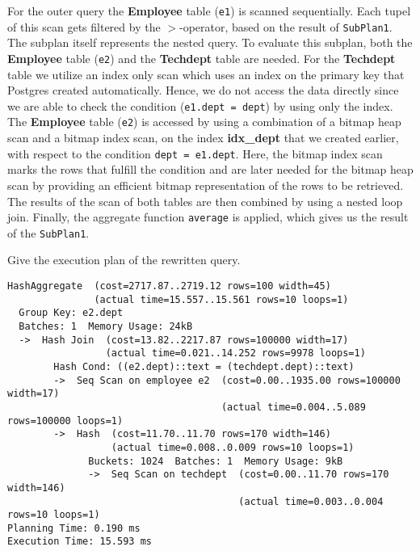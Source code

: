 \documentclass[11pt]{scrartcl}
\begin{document}
    For the outer query the \textbf{Employee} table (\texttt{e1}) is scanned sequentially.
    Each tupel of this scan gets filtered by the $>$-operator, based on the result of \texttt{SubPlan1}.
    The subplan itself represents the nested query.
    To evaluate this subplan, both the \textbf{Employee} table (\texttt{e2}) and the \textbf{Techdept} table are needed.
    For the \textbf{Techdept} table we utilize an index only scan which uses an index on the primary key that Postgres created
    automatically.
    Hence, we do not access the data directly since we are able to check the condition (\texttt{e1.dept = dept}) by using only
    the index.
    The \textbf{Employee} table (\texttt{e2}) is accessed by using a combination of a bitmap heap scan and a bitmap index scan, on the index
    \textbf{idx\_dept} that we created earlier, with respect to the condition \texttt{dept = e1.dept}.
    Here, the bitmap index scan marks the rows that fulfill the condition and are later needed for the bitmap heap scan
    by providing an efficient bitmap representation of the rows to be retrieved.
    The results of the scan of both tables are then combined by using a nested loop join.
    Finally, the aggregate function \texttt{average} is applied, which gives us the result of the \texttt{SubPlan1}.

    Give the execution plan of the rewritten query.

            {\small
    \parskip0pt\begin{verbatim}
HashAggregate  (cost=2717.87..2719.12 rows=100 width=45)
               (actual time=15.557..15.561 rows=10 loops=1)
  Group Key: e2.dept
  Batches: 1  Memory Usage: 24kB
  ->  Hash Join  (cost=13.82..2217.87 rows=100000 width=17)
                 (actual time=0.021..14.252 rows=9978 loops=1)
        Hash Cond: ((e2.dept)::text = (techdept.dept)::text)
        ->  Seq Scan on employee e2  (cost=0.00..1935.00 rows=100000 width=17)
                                     (actual time=0.004..5.089 rows=100000 loops=1)
        ->  Hash  (cost=11.70..11.70 rows=170 width=146)
                  (actual time=0.008..0.009 rows=10 loops=1)
              Buckets: 1024  Batches: 1  Memory Usage: 9kB
              ->  Seq Scan on techdept  (cost=0.00..11.70 rows=170 width=146)
                                        (actual time=0.003..0.004 rows=10 loops=1)
Planning Time: 0.190 ms
Execution Time: 15.593 ms
    \end{verbatim}}
\end{document}
